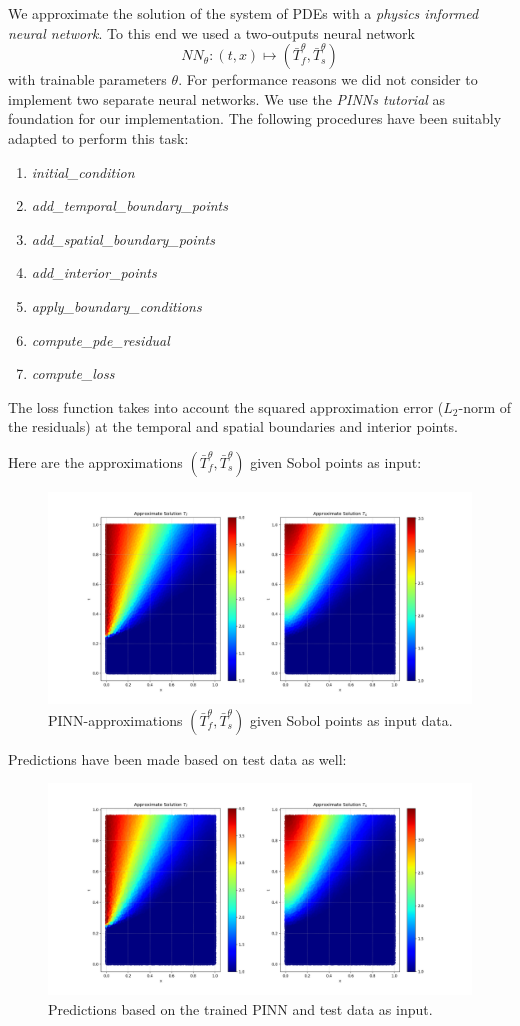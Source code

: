 \documentclass[letterpaper,12pt]{article}
\begin{document}
We approximate the solution of the system of PDEs with a \textit{physics informed neural network}. To this end we used a two-outputs neural network 
\[
N\!N_{\theta}\colon(t, x)\mapsto\left(\bar{T}_{f}^{\theta}, \bar{T}_{s}^{\theta}\right)
\]
with trainable parameters $\theta.$ For performance reasons we did not consider to implement two separate neural networks. We use the  \textit{PINNs tutorial} as foundation for our implementation. The following procedures have been suitably adapted to perform this task:
\begin{enumerate}
	\setlength\itemsep{-0.2em}
  	\item\textit{initial\_condition}
	\item\textit{add\_temporal\_boundary\_points}
	\item\textit{add\_spatial\_boundary\_points}
	\item\textit{add\_interior\_points}
	\item\textit{apply\_boundary\_conditions}
	\item\textit{compute\_pde\_residual}
	\item\textit{compute\_loss}
\end{enumerate}
The loss function takes into account the squared approximation error ($L_2$-norm of the residuals) at the temporal and spatial boundaries and interior points. 

Here are the approximations $(\bar{T}_{f}^{\theta}, \bar{T}_{s}^{\theta})$ given Sobol points as input:
\begin{figure}[!htb]
    \centering
    \includegraphics[width=.7\textwidth]{Graphics/Task1_Approximate_Solution.png}
    \caption{PINN-approximations $(\bar{T}_{f}^{\theta}, \bar{T}_{s}^{\theta})$ given Sobol points as input data.}
\end{figure}

Predictions have been made based on test data as well: 
\begin{figure}[!htb]
    \centering
    \includegraphics[width=.7\textwidth]{Graphics/Task1_Prediction_Solution.png}
    \caption{Predictions based on the trained PINN and test data as input.}
\end{figure}
\FloatBarrier
\end{document}
